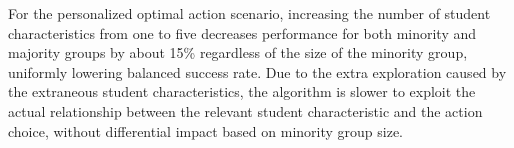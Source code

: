
For the personalized optimal action scenario, increasing the number of student characteristics from one to five decreases performance for both minority and majority groups by about 15\% regardless of the size of the minority group, uniformly lowering balanced success rate. Due to the extra exploration caused by the extraneous student characteristics, the algorithm is slower to exploit the actual relationship between the relevant student characteristic and the action choice, without differential impact based on minority group size.

